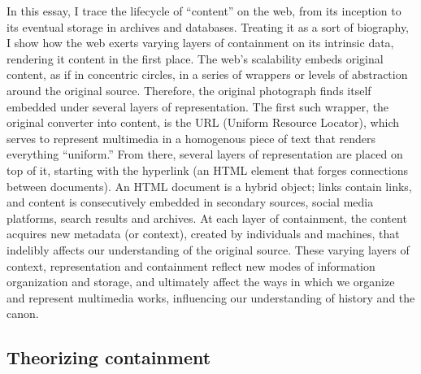 In this essay, I trace the lifecycle of “content” on the web, from its inception to its eventual storage in archives and databases. Treating it as a sort of biography, I show how the web exerts varying layers of containment on its intrinsic data, rendering it content in the first place. The web’s scalability embeds original content, as if in concentric circles, in a series of wrappers or levels of abstraction around the original source. Therefore, the original photograph finds itself embedded under several layers of representation. The first such wrapper, the original converter into content, is the URL (Uniform Resource Locator), which serves to represent multimedia in a homogenous piece of text that renders everything “uniform.” From there, several layers of representation are placed on top of it, starting with the hyperlink (an HTML element that forges connections between documents). An HTML document is a hybrid object; links contain links, and content is consecutively embedded in secondary sources, social media platforms, search results and archives. At each layer of containment, the content acquires new metadata (or context), created by individuals and machines, that indelibly affects our understanding of the original source. These varying layers of context, representation and containment reflect new modes of information organization and storage, and ultimately affect the ways in which we organize and represent multimedia works, influencing our understanding of history and the canon.

\subsection{Theorizing containment}

